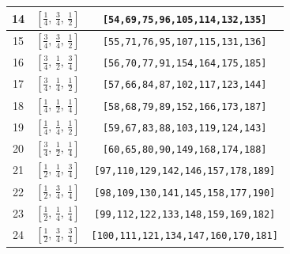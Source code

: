 \documentclass[fleqn,8pt]{jsarticle}
\begin{document}
\begin{longtable}{ccc}
14 & $\left[ \frac{1}{4},\, \frac{3}{4},\, \frac{1}{2} \right]$ & {\tt [54,69,75,96,105,114,132,135]} \\ \hline
15 & $\left[ \frac{3}{4},\, \frac{3}{4},\, \frac{1}{2} \right]$ & {\tt [55,71,76,95,107,115,131,136]} \\ \hline
16 & $\left[ \frac{3}{4},\, \frac{1}{2},\, \frac{3}{4} \right]$ & {\tt [56,70,77,91,154,164,175,185]} \\ \hline
17 & $\left[ \frac{3}{4},\, \frac{1}{4},\, \frac{1}{2} \right]$ & {\tt [57,66,84,87,102,117,123,144]} \\ \hline
18 & $\left[ \frac{1}{4},\, \frac{1}{2},\, \frac{1}{4} \right]$ & {\tt [58,68,79,89,152,166,173,187]} \\ \hline
19 & $\left[ \frac{1}{4},\, \frac{1}{4},\, \frac{1}{2} \right]$ & {\tt [59,67,83,88,103,119,124,143]} \\ \hline
20 & $\left[ \frac{3}{4},\, \frac{1}{2},\, \frac{1}{4} \right]$ & {\tt [60,65,80,90,149,168,174,188]} \\ \hline
21 & $\left[ \frac{1}{2},\, \frac{1}{4},\, \frac{3}{4} \right]$ & {\tt [97,110,129,142,146,157,178,189]} \\ \hline
22 & $\left[ \frac{1}{2},\, \frac{3}{4},\, \frac{1}{4} \right]$ & {\tt [98,109,130,141,145,158,177,190]} \\ \hline
23 & $\left[ \frac{1}{2},\, \frac{1}{4},\, \frac{1}{4} \right]$ & {\tt [99,112,122,133,148,159,169,182]} \\ \hline
24 & $\left[ \frac{1}{2},\, \frac{3}{4},\, \frac{3}{4} \right]$ & {\tt [100,111,121,134,147,160,170,181]} \\
\end{longtable}
\renewcommand{\arraystretch}{1.2}
\end{document}
